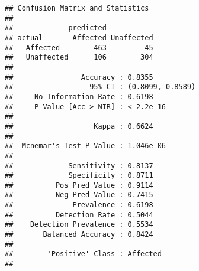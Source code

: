 \documentclass[
]{article}
\begin{document}
\begin{verbatim}
## Confusion Matrix and Statistics
## 
##             predicted
## actual       Affected Unaffected
##   Affected        463         45
##   Unaffected      106        304
##                                           
##                Accuracy : 0.8355          
##                  95% CI : (0.8099, 0.8589)
##     No Information Rate : 0.6198          
##     P-Value [Acc > NIR] : < 2.2e-16       
##                                           
##                   Kappa : 0.6624          
##                                           
##  Mcnemar's Test P-Value : 1.046e-06       
##                                           
##             Sensitivity : 0.8137          
##             Specificity : 0.8711          
##          Pos Pred Value : 0.9114          
##          Neg Pred Value : 0.7415          
##              Prevalence : 0.6198          
##          Detection Rate : 0.5044          
##    Detection Prevalence : 0.5534          
##       Balanced Accuracy : 0.8424          
##                                           
##        'Positive' Class : Affected        
## 
\end{verbatim}
\end{document}
